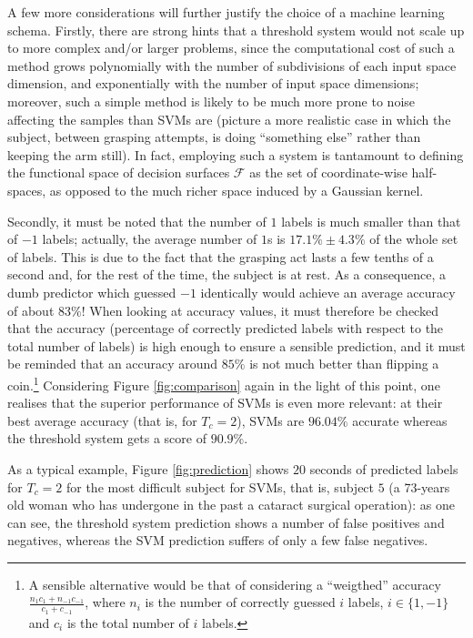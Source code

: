 \documentclass{article}
\begin{document}
A few more considerations will further justify the choice of a machine
learning schema. Firstly, there are strong hints that a threshold
system would not scale up to more complex and/or larger problems,
since the computational cost of such a method grows polynomially with
the number of subdivisions of each input space dimension, and
exponentially with the number of input space dimensions; moreover,
such a simple method is likely to be much more prone to noise
affecting the samples than SVMs are (picture a more realistic case in
which the subject, between grasping attempts, is doing ``something
else'' rather than keeping the arm still). In fact, employing such a
system is tantamount to defining the functional space of decision
surfaces $\mathcal{F}$ as the set of coordinate-wise half-spaces, as
opposed to the much richer space induced by a Gaussian kernel.

Secondly, it must be noted that the number of $1$ labels is much
smaller than that of $-1$ labels; actually, the average number of $1$s
is $17.1\% \pm 4.3\%$ of the whole set of labels. This is due to the
fact that the grasping act lasts a few tenths of a second and, for the
rest of the time, the subject is at rest.  As a consequence, a dumb
predictor which guessed $-1$ identically would achieve an average
accuracy of about $83\%$! When looking at accuracy values, it must
therefore be checked that the accuracy (percentage of correctly
predicted labels with respect to the total number of labels) is high
enough to ensure a sensible prediction, and it must be reminded that
an accuracy around $85\%$ is not much better than flipping a
coin.\footnote{A sensible alternative would be that of considering a
``weigthed'' accuracy $\frac{n_1 c_1 + n_{-1} c_{-1}}{c_1+c_{-1}}$,
where $n_i$ is the number of correctly guessed $i$ labels, $i \in
\{1,-1\}$ and $c_i$ is the total number of $i$ labels.} Considering
Figure \ref{fig:comparison} again in the light of this point, one
realises that the superior performance of SVMs is even more relevant:
at their best average accuracy (that is, for $T_c=2$), SVMs are
$96.04\%$ accurate whereas the threshold system gets a score of
$90.9\%$.

As a typical example, Figure \ref{fig:prediction} shows $20$ seconds
of predicted labels for $T_c=2$ for the most difficult subject for
SVMs, that is, subject $5$ (a 73-years old woman who has undergone in
the past a cataract surgical operation): as one can see, the threshold
system prediction shows a number of false positives and negatives,
whereas the SVM prediction suffers of only a few false negatives.
\end{document}
